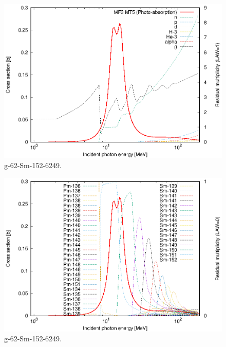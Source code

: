 \begin{figure}
 \includegraphics[width=\linewidth]{eps/g_62-Sm-152_6249.eps}
  \caption{g-62-Sm-152-6249.}
\end{figure}
\begin{figure}
 \includegraphics[width=\linewidth]{eps-law0/g_62-Sm-152_6249.eps}
 \caption{g-62-Sm-152-6249.}
\end{figure}
\newpage \clearpage

